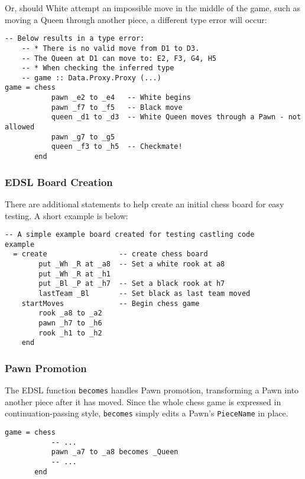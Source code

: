 \documentclass[12pt, a4paper]{scrartcl}
\begin{document}
Or, should White attempt an impossible move in the middle of the game, such as moving a Queen through another piece, a different type error will occur:

\begin{lstlisting}
-- Below results in a type error:
    -- * There is no valid move from D1 to D3.
    -- The Queen at D1 can move to: E2, F3, G4, H5
    -- * When checking the inferred type
    -- game :: Data.Proxy.Proxy (...)
game = chess
           pawn _e2 to _e4   -- White begins
           pawn _f7 to _f5   -- Black move
           queen _d1 to _d3  -- White Queen moves through a Pawn - not allowed
           pawn _g7 to _g5
           queen _f3 to _h5  -- Checkmate!
       end
\end{lstlisting}

\subsubsection{EDSL Board Creation}

There are additional statements to help create an initial chess board for easy testing. A short example is below:

\begin{lstlisting}
-- A simple example board created for testing castling code
example
  = create                 -- create chess board
        put _Wh _R at _a8  -- Set a white rook at a8
        put _Wh _R at _h1
        put _Bl _P at _h7  -- Set a black rook at h7
        lastTeam _Bl       -- Set black as last team moved
    startMoves             -- Begin chess game
        rook _a8 to _a2
        pawn _h7 to _h6
        rook _h1 to _h2
    end
\end{lstlisting}

\subsubsection{Pawn Promotion}

The EDSL function \lstinline{becomes} handles Pawn promotion, transforming a Pawn into another piece after it has moved. Since the whole chess game is expressed in continuation-passing style, \lstinline{becomes} simply edits a Pawn's \lstinline{PieceName} in place.

\begin{lstlisting}
game = chess
           -- ...
           pawn _a7 to _a8 becomes _Queen
           -- ...
       end
\end{lstlisting}
\end{document}

